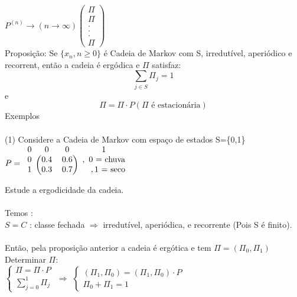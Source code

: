 \documentclass[a4paper,12pt]{article}
\begin{document}
\(
P^{(n)}\rightarrow (n\rightarrow\infty)
\left( {\begin{array}{c}
		\Pi\\
		\Pi\\
		.\\
		.\\
		.\\
			\Pi
\end{array} } \right)
\)
\\
Proposição: Se $\{x_n,n\ge0\}$  \'e Cadeia de Markov com S, irredutível, aperiódico e recorrent, então a cadeia é ergódica e $\Pi$ satisfaz:
$$ \sum\limits_{j\in S} \Pi_j=1$$
e
$$\Pi=\Pi\cdot P (\text{$\Pi$ \'e estacion\'aria})$$
\newpage
Exemplos\\
\\
(1) Considere a Cadeia de Markov com espaço de estados S=\{0,1\} 
\\
$
P = 
\begin{blockarray}{cccc}
  0&0&0   & 1   \\
\begin{block}{r(rr)r}
0 & 0.4 & 0.6 & ,\text{ 0 = chuva} \\
1 & 0.3 & 0.7  & ,\text{1 = seco} \\	  
\end{block}
\end{blockarray}
$
\\
Estude a ergodicidade da cadeia.\\
\\
Temos :\\
$S=C$ : classe fechada $\Rightarrow$ irredut\'ivel, aperi\'odica, e recorrente (Pois S \'e finito).\\
\\
Então, pela proposição anterior a cadeia é ergótica e tem $\Pi=(\Pi_0,\Pi_1)$\\
Determinar $\Pi$:\\
$
\begin{cases}
	\Pi=\Pi \cdot P\\
	\sum\limits_{j=0}^{1}\Pi_j
	\end{cases}
$
$\Rightarrow$
$
\begin{cases}
(\Pi_1,\Pi_0)=(\Pi_1,\Pi_0)\cdot P\\
\Pi_0+\Pi_1=1
\end{cases}
$
\\
\end{document}
